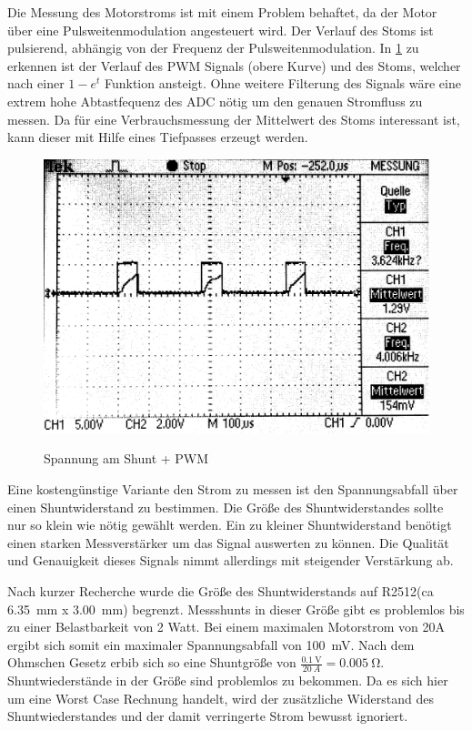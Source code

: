 Die Messung des Motorstroms ist mit einem Problem behaftet, da der Motor über eine Pulsweitenmodulation angesteuert wird. Der Verlauf des Stoms ist pulsierend, abhängig von
der Frequenz der Pulsweitenmodulation. In \cref{fig:pwm+i_0} zu erkennen ist der Verlauf des PWM Signals (obere Kurve) und des Stoms, welcher nach einer $1-e^t$ Funktion ansteigt.
Ohne weitere Filterung des Signals wäre eine extrem hohe Abtastfequenz des ADC nötig um den genauen Stromfluss zu messen. Da für eine Verbrauchsmessung 
der Mittelwert des Stoms interessant ist, kann dieser mit Hilfe eines Tiefpasses erzeugt werden.


\begin{figure}[H]
\centering
\includegraphics[width=.8\textwidth]{oszi.png}\\
\caption{Spannung am Shunt + PWM}%
\label{fig:pwm+i_0}
\end{figure}

Eine kostengünstige Variante den Strom zu messen ist den Spannungsabfall über einen Shuntwiderstand zu bestimmen. Die Größe des Shuntwiderstandes sollte nur so klein wie nötig gewählt werden.
Ein zu kleiner Shuntwiderstand benötigt einen starken Messverstärker um das Signal auswerten zu können. Die Qualität und Genauigkeit dieses Signals nimmt allerdings mit steigender Verstärkung ab.

Nach kurzer Recherche wurde die Größe des Shuntwiderstands auf R2512(ca \SI{6,35}{\mm} x \SI{3,00}{\mm}) begrenzt. Messshunts in dieser Größe gibt es problemlos bis zu einer Belastbarkeit von 2 Watt. 
Bei einem maximalen Motorstrom von 20A ergibt sich somit ein maximaler Spannungsabfall von \SI{100}{\mV}. Nach dem Ohmschen Gesetz erbib sich so eine Shuntgröße von
$\frac{\SI{0,1}{\V}}{\SI{20}{A}}=\SI{0,005}{\ohm}$. Shuntwiederstände in der Größe sind problemlos zu bekommen.
Da es sich hier um eine Worst Case Rechnung handelt, wird der zusätzliche Widerstand des Shuntwiederstandes und der damit verringerte Strom bewusst ignoriert.

